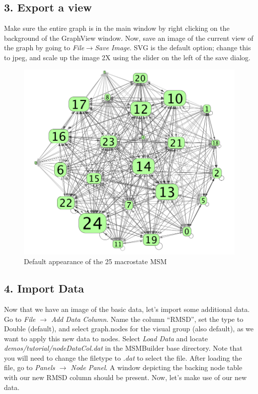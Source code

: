 \documentclass[10pt,a4paper]{report}
\begin{document}
\subsection*{3. Export a view}
Make sure the entire graph is in the main window by right clicking on the background of the GraphView window. Now, save an image of the current view of the graph by going to \emph{File$\rightarrow$Save Image}. SVG is the default option; change this to jpeg, and scale up the image 2X using the slider on the left of the save dialog. 

\begin{figure}[h]
\includegraphics[scale=.3]{basic.png}
\caption{Default appearance of the 25 macrostate MSM}
\end{figure}

\subsection*{4. Import Data}
Now that we have an image of the basic data, let's import some additional data. Go to \emph{File $\rightarrow$ Add Data Column}. Name the column ``RMSD'', set the type to Double (default), and select graph.nodes for the visual group (also default), as we want to apply this new data to nodes. Select \emph{Load Data} and locate \emph{demos/tutorial/nodeDataCol.dat} in the MSMBuilder base directory. Note that you will need to change the filetype to \emph{.dat} to select the file. 
After loading the file, go to \emph{Panels $\rightarrow$ Node Panel}. A window depicting the backing node table with our new RMSD column should be present. 
Now, let's make use of our new data.
\end{document}
